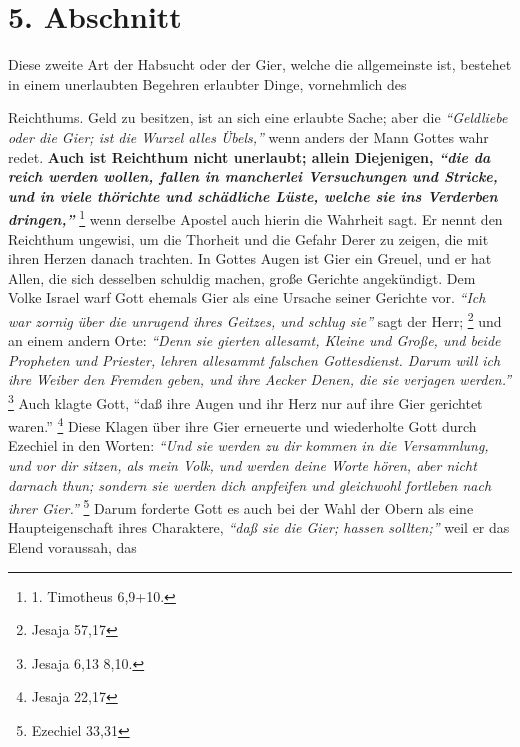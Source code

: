 \section{5. Abschnitt} \label{kap13_ab5}

Diese zweite Art der Habsucht oder der Gier, welche die allgemeinste ist,
bestehet in einem unerlaubten Begehren erlaubter Dinge, vornehmlich des

 Reichthums. Geld zu besitzen, ist an sich eine erlaubte Sache; aber die
\textit{"`Geldliebe oder die Gier; ist die Wurzel alles Übels,"'} wenn anders
der Mann
Gottes wahr redet. \label{ref:13_05_reichtum} \textbf{Auch ist
Reichthum nicht unerlaubt; allein Diejenigen,
\textit{"`die da reich werden wollen, fallen in mancherlei Versuchungen und
Stricke, und in
viele thörichte und schädliche Lüste, welche sie ins Verderben
dringen,"'}}
\footnote{1. Timotheus 6,9+10.}
wenn derselbe Apostel auch hierin die
Wahrheit sagt. Er nennt den Reichthum ungewisi, um die Thorheit und die Gefahr
Derer zu zeigen, die mit ihren Herzen danach trachten. In Gottes Augen ist
Gier ein Greuel, und er hat Allen, die sich desselben schuldig machen, große
Gerichte angekündigt. Dem Volke
Israel warf Gott ehemals Gier als eine
Ursache seiner Gerichte vor.
\textit{"`Ich war zornig über die unrugend ihres Geitzes,
und schlug sie"'} sagt der Herr;
\footnote{Jesaja 57,17}
und an einem andern Orte: 
\textit{"`Denn sie gierten allesamt, Kleine und Große, und beide Propheten und
Priester, lehren allesammt falschen Gottesdienst. Darum will ich ihre Weiber den
Fremden geben, und ihre Aecker Denen, die sie verjagen werden."'}
\footnote{Jesaja 6,13 8,10.}
Auch klagte Gott,
"`daß ihre Augen und ihr Herz nur auf ihre Gier
gerichtet waren."'
\footnote{Jesaja 22,17}
Diese Klagen über ihre Gier erneuerte
und wiederholte Gott durch Ezechiel in den Worten:
\textit{"`Und sie werden zu dir
kommen in die Versammlung, und vor dir sitzen, als mein Volk, und werden deine
Worte hören, aber nicht darnach thun; sondern sie werden dich anpfeifen und
gleichwohl fortleben nach ihrer Gier."'}
\footnote{Ezechiel 33,31}
Darum forderte
Gott es auch bei der Wahl der Obern als eine Haupteigenschaft ihres Charaktere,
\textit{"`daß sie die Gier; hassen sollten;"'} weil er das Elend voraussah, das
